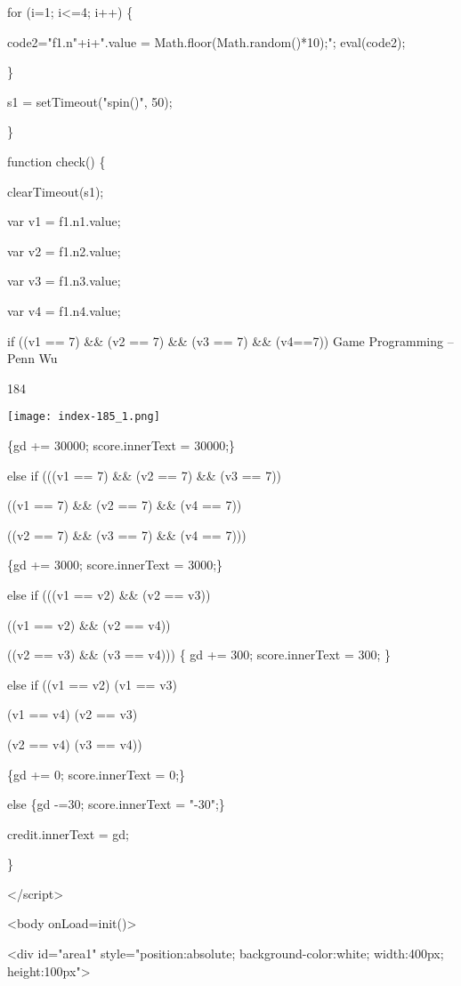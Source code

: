 \documentclass[
]{article}
\begin{document}
for (i=1; i\textless=4; i++) \{

code2="f1.n"+i+".value = Math.floor(Math.random()*10);"; eval(code2);

\}

s1 = setTimeout("spin()", 50);

\}

function check() \{

clearTimeout(s1);

var v1 = f1.n1.value;

var v2 = f1.n2.value;

var v3 = f1.n3.value;

var v4 = f1.n4.value;

if ((v1 == 7) \&\& (v2 == 7) \&\& (v3 == 7) \&\& (v4==7)) Game
Programming -- Penn Wu

184

\protect\hypertarget{index_split_011.htmlux5cux23p185}{}{}\texttt{[image: index-185\_1.png]}

\{gd += 30000; score.innerText = 30000;\}

else if (((v1 == 7) \&\& (v2 == 7) \&\& (v3 == 7)) \textbar\textbar{}

((v1 == 7) \&\& (v2 == 7) \&\& (v4 == 7)) \textbar\textbar{}

((v2 == 7) \&\& (v3 == 7) \&\& (v4 == 7)))

\{gd += 3000; score.innerText = 3000;\}

else if (((v1 == v2) \&\& (v2 == v3)) \textbar\textbar{}

((v1 == v2) \&\& (v2 == v4)) \textbar\textbar{}

((v2 == v3) \&\& (v3 == v4))) \{ gd += 300; score.innerText = 300; \}

else if ((v1 == v2) \textbar\textbar{} (v1 == v3) \textbar\textbar{}

(v1 == v4) \textbar\textbar{} (v2 == v3) \textbar\textbar{}

(v2 == v4) \textbar\textbar{} (v3 == v4))

\{gd += 0; score.innerText = 0;\}

else \{gd -=30; score.innerText = "-30";\}

credit.innerText = gd;

\}

\textless/script\textgreater{}

\textless body onLoad=init()\textgreater{}

\textless div id="area1" style="position:absolute;
background-color:white; width:400px; height:100px"\textgreater{}
\end{document}
